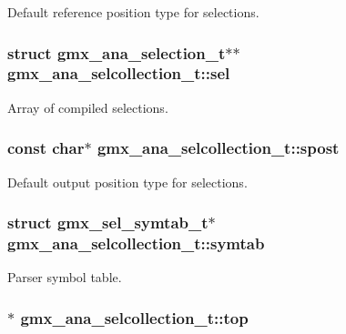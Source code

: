 \-Default reference position type for selections. \hypertarget{structgmx__ana__selcollection__t_aa15772f3b6553257458628de911c2858}{
\subsubsection[{sel}]{\setlength{\rightskip}{0pt plus 5cm}struct {\bf gmx\-\_\-ana\-\_\-selection\-\_\-t}$\ast$$\ast$ {\bf gmx\-\_\-ana\-\_\-selcollection\-\_\-t\-::sel}}}\label{structgmx__ana__selcollection__t_aa15772f3b6553257458628de911c2858}
\-Array of compiled selections. \hypertarget{structgmx__ana__selcollection__t_a5c1bbb53e09e192a19bf935e19167a47}{
\subsubsection[{spost}]{\setlength{\rightskip}{0pt plus 5cm}const char$\ast$ {\bf gmx\-\_\-ana\-\_\-selcollection\-\_\-t\-::spost}}}\label{structgmx__ana__selcollection__t_a5c1bbb53e09e192a19bf935e19167a47}
\-Default output position type for selections. \hypertarget{structgmx__ana__selcollection__t_afeae6eb7bc1ee037209268cbfbcff052}{
\subsubsection[{symtab}]{\setlength{\rightskip}{0pt plus 5cm}struct {\bf gmx\-\_\-sel\-\_\-symtab\-\_\-t}$\ast$ {\bf gmx\-\_\-ana\-\_\-selcollection\-\_\-t\-::symtab}}}\label{structgmx__ana__selcollection__t_afeae6eb7bc1ee037209268cbfbcff052}
\-Parser symbol table. \hypertarget{structgmx__ana__selcollection__t_a9598811b277e94e3a52569c692936514}{
\subsubsection[{top}]{$\ast$ {\bf gmx\-\_\-ana\-\_\-selcollection\-\_\-t\-::top}}}\label{structgmx__ana__selcollection__t_a9598811b277e94e3a52569c692936514}
